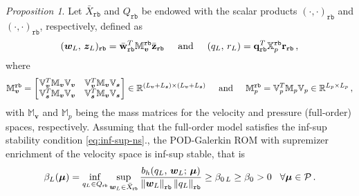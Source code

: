 \documentclass[12pt, a4paper, twoside, openright]{report}
\numberwithin{equation}{chapter}
\theoremstyle{theorem}
\theoremstyle{definition}
\theoremstyle{remark}
\theoremstyle{proposition}
\newtheorem{proposition}{Proposition}[chapter]
\numberwithin{figure}{chapter}
\newcommand{\norm}[1]{\left\lVert#1\right\rVert}
\newcommand{\bg}[1]{\boldsymbol{#1}}
\begin{document}
		\begin{proposition}
			Let $\bar{X}_{\texttt{rb}}$ and $Q_{\texttt{rb}}$ be endowed with the scalar products $(\cdot,\cdot)_{\texttt{rb}}$ and $(\cdot,\cdot)_{\texttt{rb}}$, respectively, defined as
			\begin{equation*}
				(\bg{w}_L, \, \bg{z}_L)_{\texttt{rb}} = \bar{\mathbf{w}}_{\texttt{rb}}^T \mathbb{M}_{\bg{v}}^{\texttt{rb}} \bar{\mathbf{z}}_{\texttt{rb}} \hspace*{0.5cm} \text{and} \hspace*{0.5cm} (q_L, \, r_L) = \mathbf{q}_{\texttt{rb}}^T \mathbb{X}_p^{\texttt{rb}} \mathbf{r}_{\texttt{rb}} \, ,
			\end{equation*}
			where
			\begin{equation*}
				\mathbb{M}_{\bg{v}}^{\texttt{rb}} =
				\begin{bmatrix}
				\hspace*{-0.15cm}
				\begin{array}{cc}
					\mathbb{V}_{\bg{v}}^T \mathbb{M}_{\bg{v}} \mathbb{V}_{\bg{v}} & \mathbb{V}_{\bg{v}}^T \mathbb{M}_{\bg{v}} \mathbb{V}_{\bg{s}} \\
					\mathbb{V}_{\bg{s}}^T \mathbb{M}_{\bg{v}} \mathbb{V}_{\bg{v}} & \mathbb{V}_{\bg{s}}^T \mathbb{M}_{\bg{v}} \mathbb{V}_{\bg{s}}
				\end{array} 
				\hspace*{-0.15cm}
				\end{bmatrix} 
				\in \mathbb{R}^{(L_{\bg{v}} + L_{\bg{s}}) \times (L_{\bg{v}} + L_{\bg{s}})} \hspace*{0.5cm} \text{and} \hspace*{0.5cm} \mathbb{M}_p^{\texttt{rb}} = \mathbb{V}_p^T \mathbb{M}_p \mathbb{V}_p \in \mathbb{R}^{L_p \times L_p}\, ,
			\end{equation*}
			with $\mathbb{M}_{\bg{v}}$ and $\mathbb{M}_p$ being the mass matrices for the velocity and pressure (full-order) spaces, respectively. Assuming that the full-order model satisfies the inf-sup stability condition \eqref{eq:inf-sup-ns}., the POD-Galerkin ROM with supremizer enrichment of the velocity space is inf-sup stable, that is
			\begin{equation}
				\label{eq:inf-sup-ns-reduced}
				\beta_L(\bg{\mu}) = \inf_{q_L \in Q_{\texttt{rb}}} \sup_{\bg{w}_L \in \bar{X}_{\texttt{rb}}} \dfrac{b_h(q_L, \, \bg{w}_L; \, \bg{\mu})}{\norm{\bg{w}_L}_{\texttt{rb}} \norm{q_L}_{\texttt{rb}}} \geq \beta_{0\,L} \geq \beta_0 > 0 \hspace*{0.3cm} \forall \bg{\mu} \in \mathcal{P} \, .
			\end{equation}
		\end{proposition}
	
\end{document}
